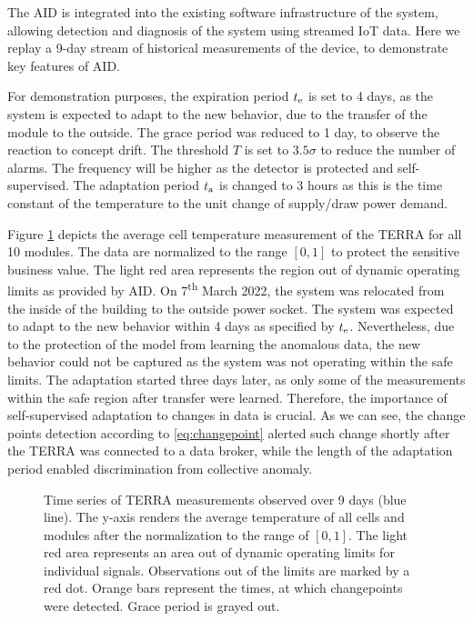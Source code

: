 The AID is integrated into the existing software infrastructure of the system, allowing detection and diagnosis of the system using streamed IoT data. Here we replay a 9-day stream of historical measurements of the device, to demonstrate key features of AID.

For demonstration purposes, the expiration period $t _{\text{e}}$ is set to 4 days, as the system is expected to adapt to the new behavior, due to the transfer of the module to the outside. The grace period was reduced to 1 day, to observe the reaction to concept drift. The threshold $T$ is set to $3.5 \sigma$ to reduce the number of alarms. The frequency will be higher as the detector is protected and self-supervised. The adaptation period $t _{\text{a}}$ is changed to 3 hours as this is the time constant of the temperature to the unit change of supply/draw power demand.

Figure \ref{fig:terra_no_change} depicts the average cell temperature measurement of the TERRA for all 10 modules. The data are normalized to the range $[0, 1]$ to protect the sensitive business value. The light red area represents the region out of dynamic operating limits as provided by AID. On 7\textsuperscript{th} March 2022, the system was relocated from the inside of the building to the outside power socket. The system was expected to adapt to the new behavior within 4 days as specified by $t _{\text{e}}$. Nevertheless, due to the protection of the model from learning the anomalous data, the new behavior could not be captured as the system was not operating within the safe limits. The adaptation started three days later, as only some of the measurements within the safe region after transfer were learned. Therefore, the importance of self-supervised adaptation to changes in data is crucial. As we can see, the change points detection according to \eqref{eq:changepoint} alerted such change shortly after the TERRA was connected to a data broker, while the length of the adaptation period enabled discrimination from collective anomaly.

\begin{figure}
 \centering
 \caption{Time series of TERRA measurements observed over 9 days (blue line). The y-axis renders the average temperature of all cells and modules after the normalization to the range of $[0, 1]$. The light red area represents an area out of dynamic operating limits for individual signals. Observations out of the limits are marked by a red dot. Orange bars represent the times, at which changepoints were detected. Grace period is grayed out.}
 \label{fig:terra_no_change}
\end{figure}


